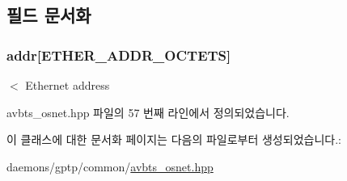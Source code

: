 \subsection{필드 문서화}
\subsubsection[{\texorpdfstring{addr}{addr}}]{ addr\mbox{[}{\bf E\+T\+H\+E\+R\+\_\+\+A\+D\+D\+R\+\_\+\+O\+C\+T\+E\+TS}\mbox{]}\hspace{0.3cm}{\ttfamily [private]}}\hypertarget{class_link_layer_address_ab8af51bba340e97aebc45b9c943fb17c}{}\label{class_link_layer_address_ab8af51bba340e97aebc45b9c943fb17c}


$<$ Ethernet address 



avbts\+\_\+osnet.\+hpp 파일의 57 번째 라인에서 정의되었습니다.



이 클래스에 대한 문서화 페이지는 다음의 파일로부터 생성되었습니다.\+:\begin{DoxyCompactItemize}
\item 
daemons/gptp/common/\hyperlink{avbts__osnet_8hpp}{avbts\+\_\+osnet.\+hpp}\end{DoxyCompactItemize}
